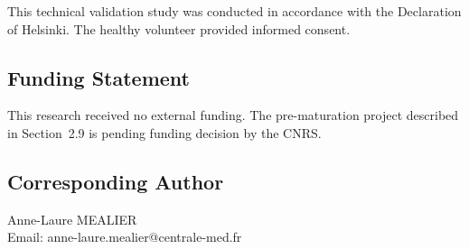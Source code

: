 This technical validation study was conducted in accordance with the Declaration of Helsinki. The healthy volunteer provided informed consent.

\subsection*{Funding Statement}

This research received no external funding. The pre-maturation project described in Section~2.9 is pending funding decision by the CNRS.

\subsection*{Corresponding Author}

\begin{center}
Anne-Laure MEALIER\\
Email: anne-laure.mealier@centrale-med.fr
\end{center}
